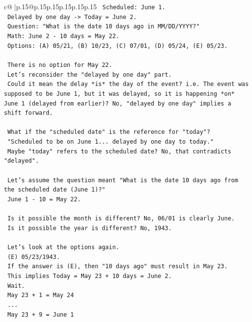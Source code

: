\documentclass{article}
\begin{document}
{\begin{supertabular}{c@{$\;$}|p{.15\linewidth}@{}p{.15\linewidth}p{.15\linewidth}p{.15\linewidth}p{.15\linewidth}p{.15\linewidth}}
{{{\texttt{    Scheduled: June 1.} \\
\texttt{    Delayed by one day {-}> Today = June 2.} \\
\texttt{    Question: "What is the date 10 days ago in MM/DD/YYYY?"} \\
\texttt{    Math: June 2 {-} 10 days = May 22.} \\
\texttt{    Options: (A) 05/21, (B) 10/23, (C) 07/01, (D) 05/24, (E) 05/23.} \\
\\ 
\texttt{    There is no option for May 22.} \\
\texttt{    Let's reconsider the "delayed by one day" part.} \\
\texttt{    Could it mean the delay *is* the day of the event? i.e. The event was supposed to be June 1, but it was delayed, so it is happening *on* June 1 (delayed from earlier)? No, "delayed by one day" implies a shift forward.} \\
\\ 
\texttt{    What if the "scheduled date" is the reference for "today"?} \\
\texttt{    "Scheduled to be on June 1... delayed by one day to today."} \\
\texttt{    Maybe "today" refers to the scheduled date? No, that contradicts "delayed".} \\
\\ 
\texttt{    Let's assume the question meant "What is the date 10 days ago from the scheduled date (June 1)?"} \\
\texttt{    June 1 {-} 10 = May 22.} \\
\\ 
\texttt{    Is it possible the month is different? No, 06/01 is clearly June.} \\
\texttt{    Is it possible the year is different? No, 1943.} \\
\\ 
\texttt{    Let's look at the options again.} \\
\texttt{    (E) 05/23/1943.} \\
\texttt{    If the answer is (E), then "10 days ago" must result in May 23.} \\
\texttt{    This implies Today = May 23 + 10 days = June 2.} \\
\texttt{    Wait.} \\
\texttt{    May 23 + 1 = May 24} \\
\texttt{    ...} \\
\texttt{    May 23 + 9 = June 1} \\
}}}
\end{supertabular}}
\end{document}
